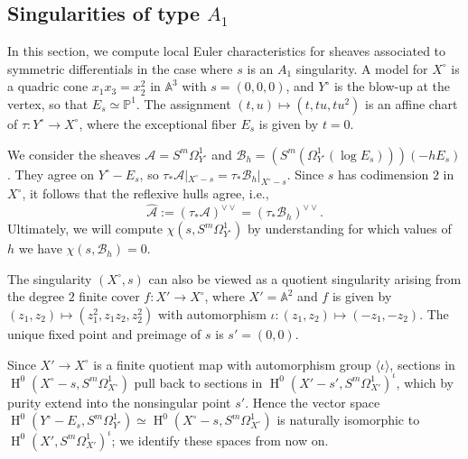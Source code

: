 \documentclass[12pt, reqno]{amsart}
\theoremstyle{definition}
\newcommand{\Aff}{{\mathbb A}}
\renewcommand{\AA}{\Aff}
\newcommand{\PP}{{\mathbb P}}
\newcommand{\calA}{{\mathcal A}}
\newcommand{\calB}{{\mathcal B}}
\DeclareMathOperator{\HH}{H}
\numberwithin{equation}{section}
\numberwithin{table}{section}
\begin{document}
\subsection{Singularities of type $A_1$}
In this section, we compute local Euler characteristics for sheaves associated to symmetric differentials in the case where $s$ is an $A_1$ singularity.  A model for $X^\circ$ is a quadric cone $x_1x_3=x_2^2$ in $\AA^3$ with $s=(0,0,0)$, and $Y^\circ$ is the blow-up at the vertex, so that $E_s\simeq \PP^1$. The assignment $(t,u)\mapsto (t,tu,tu^2)$ is an affine chart of $\tau\colon Y^\circ\to X^\circ$, where the exceptional fiber $E_s$ is given by $t=0$.

We consider the sheaves $\calA=S^m\Omega^1_{Y^\circ}$ and $\calB_h=(S^m(\Omega^1_{Y^\circ}(\log E_s)))(-hE_s)$. They agree on $Y^\circ-E_s$, so $\tau_*\calA|_{X^\circ-s}=\tau_*\calB_h|_{X^\circ-s}$. Since $s$ has codimension $2$ in $X^\circ$, it follows that the reflexive hulls agree, i.e.,
\[\hat\calA:=(\tau_*\calA)^{\vee\vee}=(\tau_*\calB_h)^{\vee\vee}.\]
Ultimately, we will compute $\chi(s,S^m\Omega^1_{Y^\circ})$ by understanding for which values of $h$ we have $\chi(s,\calB_h) = 0$.

The singularity $(X^\circ,s)$ can also be viewed as a quotient singularity arising from the degree $2$ finite cover $f\colon X'\to X^\circ$, where $X'=\AA^2$ and $f$ is given by $(z_1,z_2)\mapsto(z_1^2,z_1z_2,z_2^2)$ with automorphism $\iota\colon (z_1,z_2)\mapsto(-z_1,-z_2)$. The unique fixed point and preimage of $s$ is $s'=(0,0)$.

Since $X'\to X^\circ$ is a finite quotient map with automorphism group $\langle \iota\rangle$, sections in $\HH^0(X^\circ-s,S^m\Omega^1_{X^\circ})$ pull back to sections in $\HH^0(X'-s',S^m\Omega^1_{X'})^{\iota}$, which by purity extend into the nonsingular point $s'$. Hence the vector space $\HH^0(Y^\circ-E_s,S^m\Omega^1_{Y^\circ}) \simeq \HH^0(X^\circ-s,S^m\Omega^1_{X^\circ})$ is naturally isomorphic to $\HH^0(X',S^m\Omega^1_{X'})^{\iota}$; we identify these spaces from now on.
\end{document}
